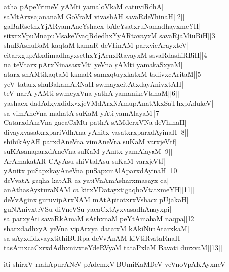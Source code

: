 \documentclass{article}
\begin{document}
atha pApeYrimeV yAMti yamaloVkaM catuviRdhA|\\
saMtArxsajananaM GoVraM vivashAH savaRdeVhinaH||2||\\
gaBaRsethxYjARyamAneYshacx bAleYsatxruNamadhayxmeYH|\\
sitxrxVpuMnapuMsakeYvaqRdedhxYyARtavayxM savaRjaMtuBiH||3||\\
shuBAshuBaM kaqtaM kamaR deVhinAM parxvicArayxteV|\\
citarxgupAtxdimadhayxsethxYjAcnxRtavayxM savaRdashiRBiH||4||\\
na teVtarx pArxNinasasxMti yeVna yAMti yamakaSxyaM|\\
atarx shAMtikaqtaM kamaR samxqtuyxkatxM tadivxcAritaM||5||\\
yeV tatarx shuBakamARNaH swmayxcitAtxdayAnivxtAH|\\
teV narA yAMti swmeyxVna yathA yamanikeVtanaM||6||\\
yashacx dadAdxyxdidxvxjeVMdArxNAmupAnatAkxSaThxpAdukeV|\\
sa vimAneVna mahatA suKaM yAti yamAlayaM||7||\\
CatarxdAneVna gacaCxMti pathA sAMderxVNa deVhinaH|\\
divayxvasatxrxpariVdhAna yAnitx vasatxrxparxdAyinaH||8||\\
shibikAyAH parxdAneVna vimAneVna suKaM varxjeVtf|\\
suKAsanaparxdAneVna suKaM yAnitx yamAlayaM||9||\\
ArAmakatAR CAyAsu shiVtalAsu suKaM varxjeVtf|\\
yAnitx puSapxkayAneVna puSapxmAlAparxdAyinaH||10||\\
deVvatA gaqha katAR ca yatiVnAmAsharxmasayx ca|\\
anAthasAyxturaNAM ca kirxVDatayxtigaqhoVtatxmeYH||11||\\
deVvAginx guruvipArxNAM mAtApitotxrxVshacx pUjakaH|\\
guNAnivxteVSu diVneVSu yacaCxtAyxvasadhAnayxpi|\\
sa parxyAti savaRkAmaM sAthxnaM peYtAmahaM naqpa||12||\\
sharxdadhxyA yeVna vipArxya datatxM kAkiNimAtarxkaM|\\
sa sAyxdidxvayxtithiBURpa deVvAnAM kiVtiRvataRnaH|\\
tasAmxcaCxrxdAdhxnivxteYdeRVyaM tataPxlaM Bavati durxvaM||13||

\begin{center}
iti shirxV mahApurANeV pAdemxV BUmiKaMDeV veVnoVpAKAyxneV
\end{center}
\end{document}
